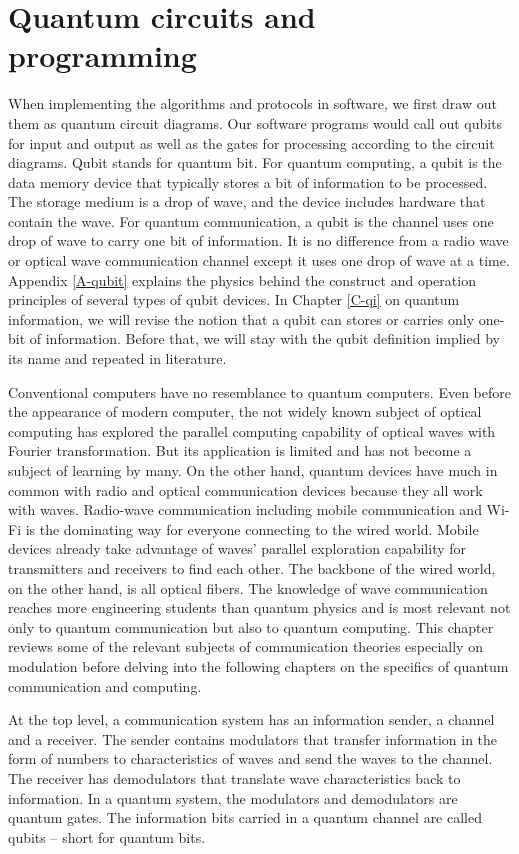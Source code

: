 \documentclass{book}
\begin{document}
\section{Quantum circuits and programming}

When implementing the algorithms and protocols in software, we first draw out them as quantum circuit diagrams. Our software programs would call out qubits for input and output as well as the gates for processing according to the circuit diagrams. Qubit stands for quantum bit. For quantum computing, a qubit is the data memory device that typically stores a bit of information to be processed. The storage medium is a drop of wave, and the device includes hardware that contain the wave. For quantum communication, a qubit is the channel uses one drop of wave to carry one bit of information. It is no difference from a radio wave or optical wave communication channel except it uses one drop of wave at a time. Appendix \ref{A-qubit} explains the physics behind the construct and operation principles of several types of qubit devices. In Chapter \ref{C-qi} on quantum information, we will revise the notion that a qubit can stores or carries only one-bit of information. Before that, we will stay with the qubit definition implied by its name and repeated in literature.

Conventional computers have no resemblance to quantum computers. Even before the appearance of modern computer, the not widely known subject of optical computing has explored the parallel computing capability of optical waves with Fourier transformation. But its application is limited and has not become a subject of learning by many. On the other hand, quantum devices have much in common with radio and optical communication devices because they all work with waves. Radio-wave communication including mobile communication and Wi-Fi is the dominating way for everyone connecting to the wired world. Mobile devices already take advantage of waves' parallel exploration capability for transmitters and receivers to find each other. The backbone of the wired world, on the other hand, is all optical fibers. The knowledge of wave communication reaches more engineering students than quantum physics and is most relevant not only to quantum communication but also to quantum computing. This chapter reviews some of the relevant subjects of communication theories especially on modulation before delving into the following chapters on the specifics of quantum communication and computing.

At the top level, a communication system has an information sender, a channel and a receiver. The sender contains modulators that transfer information in the form of numbers to characteristics of waves and send the waves to the channel. The receiver has demodulators that translate wave characteristics back to information. In a quantum system, the modulators and demodulators are quantum gates. The information bits carried in a quantum channel are called qubits -- short for quantum bits.
\end{document}
